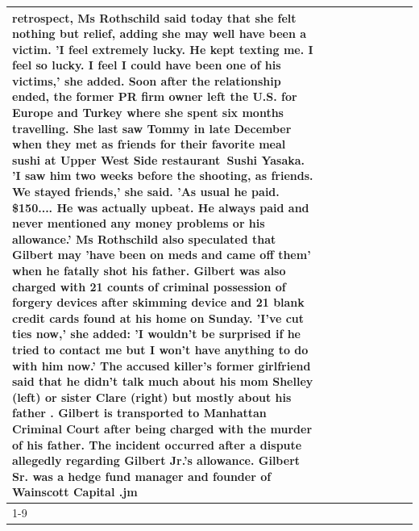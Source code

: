 \begin{table}[H]
\begin{tabular}{lllrlllll}
retrospect, Ms Rothschild said today that she felt nothing but relief, adding she may well have been a victim. 'I feel extremely lucky. He kept texting me. I feel so lucky. I feel I could have been one of his victims,' she added. Soon after the relationship ended, the former PR firm owner left the U.S. for Europe and Turkey where she spent six months  travelling. She last saw Tommy in late December when they met as friends for their favorite meal sushi at Upper West Side restaurant Sushi Yasaka. 'I saw him two weeks before the shooting, as friends. We stayed friends,' she said. 'As usual he paid. \$150.... He was actually upbeat. He always paid and never mentioned any money problems or his allowance.' Ms Rothschild also speculated that Gilbert may 'have been on meds and came off them' when he fatally shot his father. Gilbert was also charged with 21 counts of criminal possession of forgery devices after skimming device and 21 blank credit cards found at his home on Sunday. 'I've cut ties now,' she added: 'I wouldn’t be surprised if he tried to contact me but I won’t have anything to do with him now.' The accused killer's former girlfriend said that he didn't talk much about his mom Shelley (left) or sister Clare (right) but mostly about his father . Gilbert is transported to Manhattan Criminal Court  after being charged with the murder of his father. The incident occurred after a dispute allegedly regarding Gilbert Jr.'s allowance. Gilbert Sr. was a hedge fund manager and founder of Wainscott Capital .jm \\
\cline{1-9} \cline{2-9}

\end{tabular}
\end{table}
